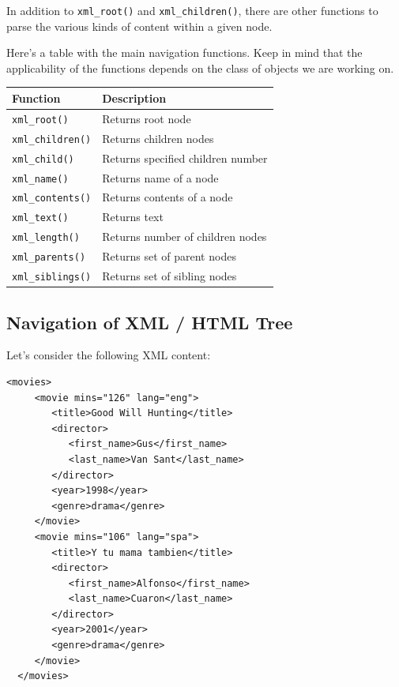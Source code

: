 \documentclass[
]{book}
\begin{document}
In addition to \texttt{xml\_root()} and \texttt{xml\_children()}, there are other functions
to parse the various kinds of content within a given node.

Here's a table with the main navigation functions. Keep in mind that the
applicability of the functions depends on the class of objects we are working on.

\begin{longtable}[]{@{}ll@{}}
\toprule()
Function & Description \\
\midrule()
\endhead
\texttt{xml\_root()} & Returns root node \\
\texttt{xml\_children()} & Returns children nodes \\
\texttt{xml\_child()} & Returns specified children number \\
\texttt{xml\_name()} & Returns name of a node \\
\texttt{xml\_contents()} & Returns contents of a node \\
\texttt{xml\_text()} & Returns text \\
\texttt{xml\_length()} & Returns number of children nodes \\
\texttt{xml\_parents()} & Returns set of parent nodes \\
\texttt{xml\_siblings()} & Returns set of sibling nodes \\
\bottomrule()
\end{longtable}

\hypertarget{navigation-of-xml-html-tree}{%
\subsection{Navigation of XML / HTML Tree}\label{navigation-of-xml-html-tree}}

Let's consider the following XML content:

\begin{verbatim}
<movies>
     <movie mins="126" lang="eng">
        <title>Good Will Hunting</title>
        <director>
           <first_name>Gus</first_name>
           <last_name>Van Sant</last_name>
        </director>
        <year>1998</year>
        <genre>drama</genre>
     </movie>
     <movie mins="106" lang="spa">
        <title>Y tu mama tambien</title>
        <director>
           <first_name>Alfonso</first_name>
           <last_name>Cuaron</last_name>
        </director>
        <year>2001</year>
        <genre>drama</genre>
     </movie>
  </movies>
\end{verbatim}
\end{document}
